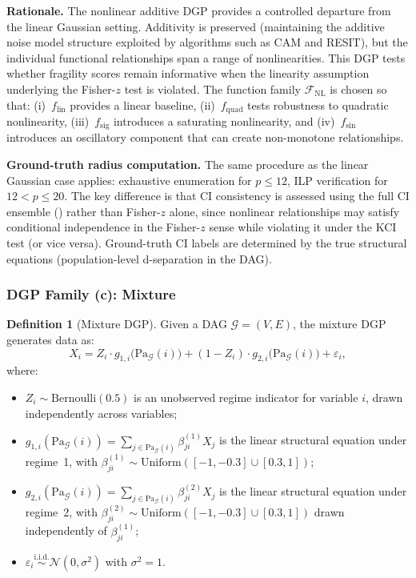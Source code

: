 \documentclass[11pt,a4paper]{article}
\theoremstyle{definition}
\newtheorem{definition}[theorem]{Definition}
\theoremstyle{remark}
\newcommand{\DAG}{\mathcal{G}}
\newcommand{\Pa}{\mathrm{Pa}}
\begin{document}
\noindent\textbf{Rationale.} The nonlinear additive DGP provides a
controlled departure from the linear Gaussian setting. Additivity is
preserved (maintaining the additive noise model structure exploited by
algorithms such as CAM and RESIT), but the individual functional
relationships span a range of nonlinearities. This DGP tests whether
fragility scores remain informative when the linearity assumption
underlying the Fisher-$z$ test is violated. The function family
$\mathcal{F}_{\mathrm{NL}}$ is chosen so that: (i)~$f_{\mathrm{lin}}$
provides a linear baseline, (ii)~$f_{\mathrm{quad}}$ tests robustness
to quadratic nonlinearity, (iii)~$f_{\mathrm{sig}}$ introduces a
saturating nonlinearity, and (iv)~$f_{\mathrm{sin}}$ introduces an
oscillatory component that can create non-monotone relationships.

\noindent\textbf{Ground-truth radius computation.} The same procedure
as the linear Gaussian case applies: exhaustive enumeration for
$p \leq 12$, ILP verification for $12 < p \leq 20$. The key difference
is that CI consistency is assessed using the full CI ensemble
() rather than Fisher-$z$ alone, since nonlinear
relationships may satisfy conditional independence in the Fisher-$z$
sense while violating it under the KCI test (or vice versa). Ground-truth
CI labels are determined by the true structural equations (population-level
d-separation in the DAG).

\subsubsection{DGP Family (c): Mixture}

\begin{definition}[Mixture DGP]\label{def:dgp_mixture}
Given a DAG $\DAG = (V, E)$, the mixture DGP generates data as:
\[
  X_i = Z_i \cdot g_{1,i}\bigl(\Pa_\DAG(i)\bigr) +
    (1 - Z_i) \cdot g_{2,i}\bigl(\Pa_\DAG(i)\bigr) + \varepsilon_i,
\]
where:
\begin{itemize}
  \item $Z_i \sim \mathrm{Bernoulli}(0.5)$ is an unobserved regime
    indicator for variable $i$, drawn independently across variables;
  \item $g_{1,i}(\Pa_\DAG(i)) = \sum_{j \in \Pa_\DAG(i)} \beta_{ji}^{(1)} X_j$
    is the linear structural equation under regime~1, with
    $\beta_{ji}^{(1)} \sim \mathrm{Uniform}([-1, -0.3] \cup [0.3, 1])$;
  \item $g_{2,i}(\Pa_\DAG(i)) = \sum_{j \in \Pa_\DAG(i)} \beta_{ji}^{(2)} X_j$
    is the linear structural equation under regime~2, with
    $\beta_{ji}^{(2)} \sim \mathrm{Uniform}([-1, -0.3] \cup [0.3, 1])$
    drawn independently of $\beta_{ji}^{(1)}$;
  \item $\varepsilon_i \stackrel{\text{i.i.d.}}{\sim} \mathcal{N}(0, \sigma^2)$
    with $\sigma^2 = 1$.
\end{itemize}
\end{definition}
\end{document}
